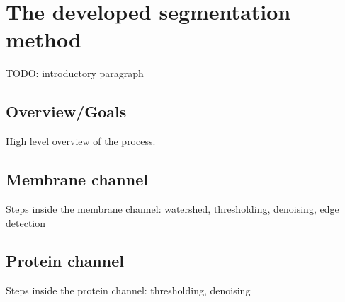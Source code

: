 \documentclass[
  digital,     %
  oneside,     %
  nosansbold,  %
  nocolorbold, %
  lof,         %
  lot,         %
]{fithesis4}
\begin{document}
\chapter{The developed segmentation method}

TODO: introductory paragraph

\section{Overview/Goals}

High level overview of the process.

\section{Membrane channel}

Steps inside the membrane channel: watershed, thresholding, denoising, edge
detection

\section{Protein channel}

Steps inside the protein channel: thresholding, denoising
\end{document}
